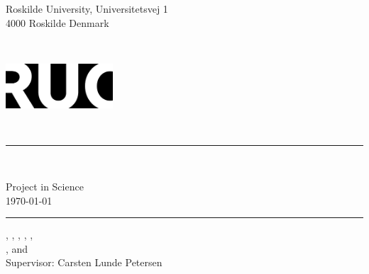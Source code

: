 \documentclass[../Orator.tex]{subfiles}
\begin{document}
\begin{titlepage}
    {\selectfont%


        \noindent
        \begin{minipage}{.45\textwidth}
            \begin{flushleft}
                Roskilde University, Universitetsvej 1\\ 4000 Roskilde Denmark
            \end{flushleft}
        \end{minipage}
        ~
        \begin{minipage}{.5\textwidth}
            \begin{flushright}
                \includegraphics[width=4cm]{Pictures/RUCLOGO.png}
            \end{flushright}
        \end{minipage}\\

        \noindent\rule{\linewidth}{0.4mm}\\
        \begin{center}
            Project in Science\\
            \today
        \end{center}
        \rule{\linewidth}{0.4mm}


        \begin{flushleft}
            \noindent
            \huge 
        \end{flushleft}

        \noindent
        , , ,  , ,\\  , and \\
        Supervisor: Carsten Lunde Petersen %

        \begin{figure}[H]
            \centering
        \end{figure}

    }
\end{titlepage}
\end{document}
